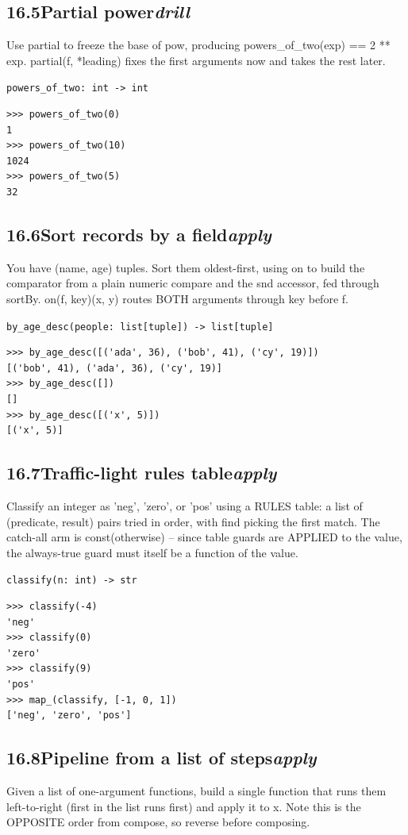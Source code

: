 \documentclass[10pt,letterpaper]{book}
\begin{document}
\subsection*{16.5\quad Partial power\hfill\textnormal{\textit{drill}}}
Use partial to freeze the base of pow, producing powers\_of\_two(exp) == 2 ** exp. partial(f, *leading) fixes the first arguments now and takes the rest later.

\noindent\texttt{powers\_of\_two: int -> int}
\begin{lstlisting}[style=ex]
>>> powers_of_two(0)
1
>>> powers_of_two(10)
1024
>>> powers_of_two(5)
32
\end{lstlisting}
\subsection*{16.6\quad Sort records by a field\hfill\textnormal{\textit{apply}}}
You have (name, age) tuples. Sort them oldest-first, using on to build the comparator from a plain numeric compare and the snd accessor, fed through sortBy. on(f, key)(x, y) routes BOTH arguments through key before f.

\noindent\texttt{by\_age\_desc(people: list[tuple]) -> list[tuple]}
\begin{lstlisting}[style=ex]
>>> by_age_desc([('ada', 36), ('bob', 41), ('cy', 19)])
[('bob', 41), ('ada', 36), ('cy', 19)]
>>> by_age_desc([])
[]
>>> by_age_desc([('x', 5)])
[('x', 5)]
\end{lstlisting}
\subsection*{16.7\quad Traffic-light rules table\hfill\textnormal{\textit{apply}}}
Classify an integer as 'neg', 'zero', or 'pos' using a RULES table: a list of (predicate, result) pairs tried in order, with find picking the first match. The catch-all arm is const(otherwise) -- since table guards are APPLIED to the value, the always-true guard must itself be a function of the value.

\noindent\texttt{classify(n: int) -> str}
\begin{lstlisting}[style=ex]
>>> classify(-4)
'neg'
>>> classify(0)
'zero'
>>> classify(9)
'pos'
>>> map_(classify, [-1, 0, 1])
['neg', 'zero', 'pos']
\end{lstlisting}
\subsection*{16.8\quad Pipeline from a list of steps\hfill\textnormal{\textit{apply}}}
Given a list of one-argument functions, build a single function that runs them left-to-right (first in the list runs first) and apply it to x. Note this is the OPPOSITE order from compose, so reverse before composing.
\end{document}
